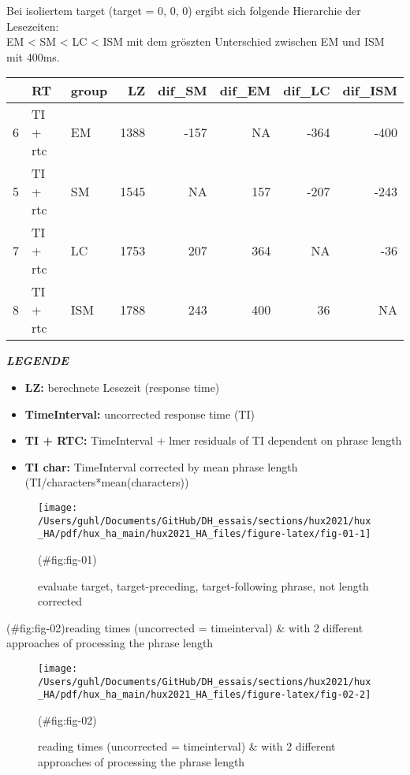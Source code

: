 \documentclass[
]{article}
\providecommand{\tightlist}{%
  \setlength{\itemsep}{0pt}\setlength{\parskip}{0pt}}
\begin{document}
Bei isoliertem target (target = 0, 0, 0) ergibt sich folgende Hierarchie der Lesezeiten:\\
EM \textless{} SM \textless{} LC \textless{} ISM mit dem gröszten Unterschied zwischen EM und ISM mit 400ms.

\begin{tabular}{l|l|l|r|r|r|r|r}
\hline
  & RT & group & LZ & dif\_SM & dif\_EM & dif\_LC & dif\_ISM\\
\hline
6 & TI + rtc & EM & 1388 & -157 & NA & -364 & -400\\
\hline
5 & TI + rtc & SM & 1545 & NA & 157 & -207 & -243\\
\hline
7 & TI + rtc & LC & 1753 & 207 & 364 & NA & -36\\
\hline
8 & TI + rtc & ISM & 1788 & 243 & 400 & 36 & NA\\
\hline
\end{tabular}

\textbf{\emph{LEGENDE}}

\begin{itemize}
\tightlist
\item
  \textbf{LZ:} berechnete Lesezeit (response time)
\item
  \textbf{TimeInterval:} uncorrected response time (TI)\\
\item
  \textbf{TI + RTC:} TimeInterval + lmer residuals of TI dependent on phrase length\\
\item
  \textbf{TI char:} TimeInterval corrected by mean phrase length (TI/characters*mean(characters))
\end{itemize}

\begin{figure}[H]
\texttt{[image: /Users/guhl/Documents/GitHub/DH\_essais/sections/hux2021/hux\_HA/pdf/hux\_ha\_main/hux2021\_HA\_files/figure-latex/fig-01-1]} \caption{evaluate target, target-preceding, target-following phrase, not length corrected}(\#fig:fig-01)
\end{figure}

(\#fig:fig-02)reading times (uncorrected = timeinterval) \& with 2 different approaches of processing the phrase length

\begin{figure}[H]
\texttt{[image: /Users/guhl/Documents/GitHub/DH\_essais/sections/hux2021/hux\_HA/pdf/hux\_ha\_main/hux2021\_HA\_files/figure-latex/fig-02-2]} \caption{reading times (uncorrected = timeinterval) & with 2 different approaches of processing the phrase length}(\#fig:fig-02)
\end{figure}
\end{document}
